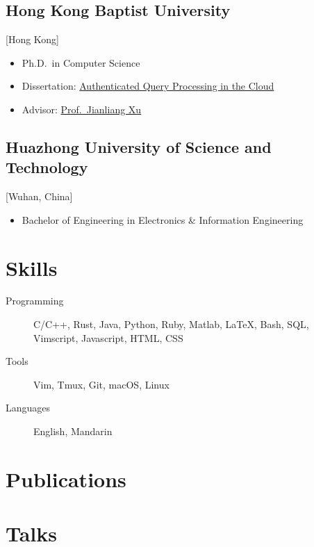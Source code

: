 \documentclass{mycv}
\begin{document}
\subsection{Hong Kong Baptist University}[Hong Kong]
\vspace{-\parskip}%
\begin{itemize}[label={}]
  \item Ph.D.\ in Computer Science 
  \item Dissertation: \href{https://repository.hkbu.edu.hk/etd_oa/620}{Authenticated Query Processing in the Cloud}
  \item Advisor: \href{https://www.comp.hkbu.edu.hk/~xujl}{Prof.~Jianliang Xu}
\end{itemize}

\subsection{Huazhong University of Science and Technology}[Wuhan, China]
\vspace{-\parskip}%
\begin{itemize}[label={}]
  \item Bachelor of Engineering in Electronics \& Information Engineering 
\end{itemize}

\section{Skills}

\begin{description}
  \item[Programming]
    \parbox[t]{\linegoal}{
      \strut%
      C/C++, Rust, Java, Python, Ruby, Matlab, \LaTeX, Bash, SQL, Vimscript, Javascript, HTML, CSS
      \strut%
    }
  \item[Tools] Vim, Tmux, Git, macOS, Linux
  \item[Languages] English, Mandarin
\end{description}

\section{Publications}%


\section{Talks}
\end{document}
